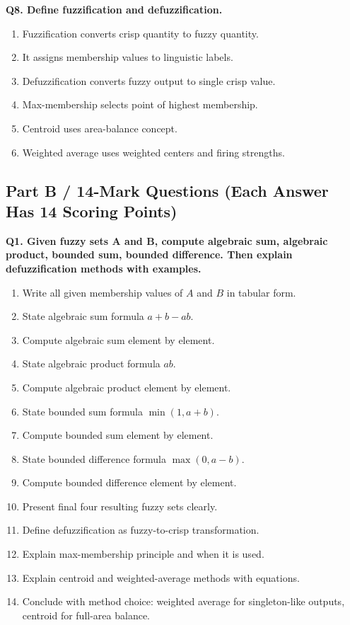 \documentclass[11pt,a4paper]{article}
\begin{document}
\textbf{Q8. Define fuzzification and defuzzification.}
\begin{enumerate}
\item Fuzzification converts crisp quantity to fuzzy quantity.
\item It assigns membership values to linguistic labels.
\item Defuzzification converts fuzzy output to single crisp value.
\item Max-membership selects point of highest membership.
\item Centroid uses area-balance concept.
\item Weighted average uses weighted centers and firing strengths.
\end{enumerate}

\subsection*{Part B / 14-Mark Questions (Each Answer Has 14 Scoring Points)}

\textbf{Q1. Given fuzzy sets A and B, compute algebraic sum, algebraic product, bounded sum, bounded difference. Then explain defuzzification methods with examples.}
\begin{enumerate}
\item Write all given membership values of $A$ and $B$ in tabular form.
\item State algebraic sum formula $a+b-ab$.
\item Compute algebraic sum element by element.
\item State algebraic product formula $ab$.
\item Compute algebraic product element by element.
\item State bounded sum formula $\min(1,a+b)$.
\item Compute bounded sum element by element.
\item State bounded difference formula $\max(0,a-b)$.
\item Compute bounded difference element by element.
\item Present final four resulting fuzzy sets clearly.
\item Define defuzzification as fuzzy-to-crisp transformation.
\item Explain max-membership principle and when it is used.
\item Explain centroid and weighted-average methods with equations.
\item Conclude with method choice: weighted average for singleton-like outputs, centroid for full-area balance.
\end{enumerate}
\end{document}
